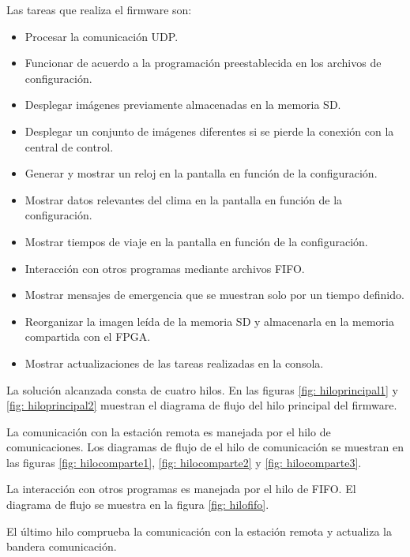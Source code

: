 Las tareas que realiza el firmware son:
\begin{itemize}
\item Procesar la comunicación UDP.
\item Funcionar de acuerdo a la programación preestablecida en los archivos de configuración.
\item Desplegar imágenes previamente almacenadas en la memoria SD.  
\item Desplegar un conjunto de imágenes diferentes si se pierde la conexión con la central de control.
\item Generar y mostrar un reloj en la pantalla en función de la configuración.
\item Mostrar datos relevantes del clima en la pantalla en función de la configuración.
\item Mostrar tiempos de viaje en la pantalla en función de la configuración.
\item Interacción con otros programas mediante archivos FIFO.
\item Mostrar mensajes de emergencia que se muestran solo por un tiempo definido.
\item Reorganizar la imagen leída de la memoria SD y almacenarla en la memoria compartida con el FPGA.
\item Mostrar actualizaciones de las tareas realizadas en la consola.
\end{itemize}

La solución alcanzada consta de cuatro hilos. En las figuras \ref{fig: hiloprincipal1} y \ref{fig: hiloprincipal2} muestran el diagrama de flujo del hilo principal del firmware. 

La comunicación con la estación remota es manejada por el hilo de comunicaciones. Los diagramas de flujo de el hilo de comunicación se muestran en las figuras \ref{fig: hilocomparte1}, \ref{fig: hilocomparte2} y \ref{fig: hilocomparte3}.

La interacción con otros programas es manejada por el hilo de FIFO. El diagrama de flujo se muestra en la figura \ref{fig: hilofifo}.

El último hilo comprueba la comunicación con la estación remota y actualiza la bandera comunicación.


